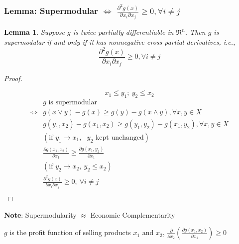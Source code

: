 \documentclass[11pt,a4paper]{article}
\newtheorem{lemma}{Lemma}
\begin{document}
\subsubsection{Lemma: Supermodular $\Leftrightarrow$ $
\frac{\partial^{2} g(x)}{\partial x_{i} \partial x_{j}} \geq 0, \forall i \neq j
$}
\begin{lemma}
    Suppose $g$ is twice partially differentiable in $\mathfrak{R}^{n}$. Then $g$ is supermodular if and only if it has nonnegative cross partial derivatives, i.e.,
    $$
    \frac{\partial^{2} g(x)}{\partial x_{i} \partial x_{j}} \geq 0, \forall i \neq j
    $$
\end{lemma}
\begin{proof}
\quad

\begin{center}
\end{center}
$$x_1\leq y_1;\ y_2\leq x_2$$
\begin{equation}
    \begin{aligned}
        &g\text{ is supermodular}\\
        \Leftrightarrow	& g(x \vee y)-g(x)\geq g(y)-g(x \wedge y), \forall x, y \in X\\
        & g(y_1,x_2)-g(x_1,x_2)\geq g(y_1,y_2)-g(x_1,y_2), \forall x, y \in X\\
        &(\text{if }y_1 \rightarrow	x_1,\text{ $y_2$ kept unchanged})\\
        &\frac{\partial g(x_1,x_2)}{\partial x_1}\geq \frac{\partial g(x_1,y_2)}{\partial x_1}\\
        &(\text{if }y_2 \rightarrow	x_2,\ y_2\leq x_2)\\
        &\frac{\partial^2 g(x)}{\partial x_i\partial x_j}\geq 0,\ \forall i\neq j\\
    \end{aligned}
    \nonumber
\end{equation}
\end{proof}
\textbf{Note}: Supermodularity $\approx$ Economic Complementarity

$g$ is the profit function of selling products $x_1$ and $x_2$, $\frac{\partial}{\partial x_2}(\frac{\partial g(x_1,x_2)}{\partial x_1})\geq 0$
\end{document}
